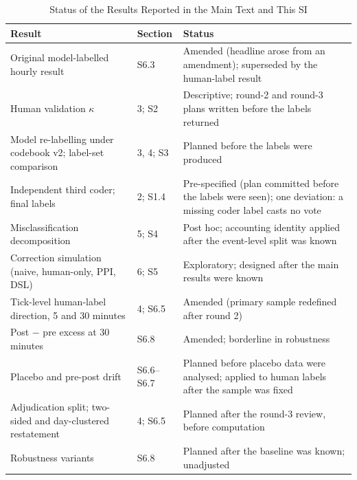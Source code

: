 \documentclass[11pt]{article}
\begin{document}
\begin{table}[h]
\centering
\small
\caption{Status of the Results Reported in the Main Text and This SI}
\label{tab:status}
\begin{tabular}{p{6.2cm}p{2cm}p{6.8cm}}
\toprule
Result & Section & Status \\
\midrule
Original model-labelled hourly result & S6.3 & Amended (headline arose from an amendment); superseded by the human-label result \\
Human validation $\kappa$ & 3; S2 & Descriptive; round-2 and round-3 plans written before the labels returned \\
Model re-labelling under codebook v2; label-set comparison & 3, 4; S3 & Planned before the labels were produced \\
Independent third coder; final labels & 2; S1.4 & Pre-specified (plan committed before the labels were seen); one deviation: a missing coder label casts no vote \\
Misclassification decomposition & 5; S4 & Post hoc; accounting identity applied after the event-level split was known \\
Correction simulation (naive, human-only, PPI, DSL) & 6; S5 & Exploratory; designed after the main results were known \\
Tick-level human-label direction, 5 and 30 minutes & 4; S6.5 & Amended (primary sample redefined after round 2) \\
Post $-$ pre excess at 30 minutes & S6.8 & Amended; borderline in robustness \\
Placebo and pre-post drift & S6.6--S6.7 & Planned before placebo data were analysed; applied to human labels after the sample was fixed \\
Adjudication split; two-sided and day-clustered restatement & 4; S6.5 & Planned after the round-3 review, before computation \\
Robustness variants & S6.8 & Planned after the baseline was known; unadjusted \\
\bottomrule
\end{tabular}
\end{table}
\end{document}
